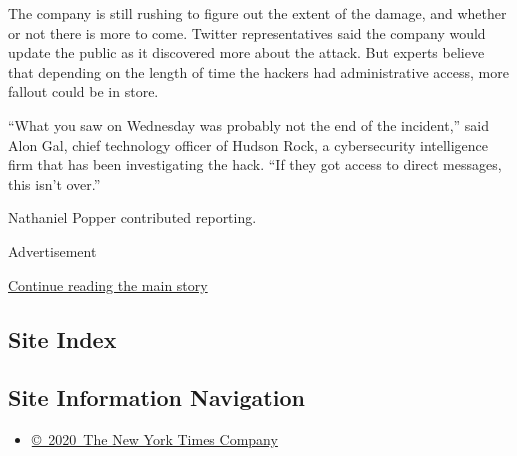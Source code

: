 The company is still rushing to figure out the extent of the damage, and
whether or not there is more to come. Twitter representatives said the
company would update the public as it discovered more about the attack.
But experts believe that depending on the length of time the hackers had
administrative access, more fallout could be in store.

``What you saw on Wednesday was probably not the end of the incident,''
said Alon Gal, chief technology officer of Hudson Rock, a cybersecurity
intelligence firm that has been investigating the hack. ``If they got
access to direct messages, this isn't over.''

Nathaniel Popper contributed reporting.

Advertisement

\protect\hyperlink{after-bottom}{Continue reading the main story}

\hypertarget{site-index}{%
\subsection{Site Index}\label{site-index}}

\hypertarget{site-information-navigation}{%
\subsection{Site Information
Navigation}\label{site-information-navigation}}

\begin{itemize}
\tightlist
\item
  \href{https://help.nytimes3xbfgragh.onion/hc/en-us/articles/115014792127-Copyright-notice}{©~2020~The
  New York Times Company}
\end{itemize}

